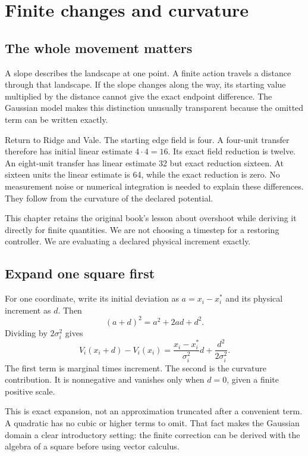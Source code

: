 \chapter{Finite changes and curvature}\label{ch:finite}

\section{The whole movement matters}
A slope describes the landscape at one point. A finite action travels a distance through that landscape. If the slope changes along the way, its starting value multiplied by the distance cannot give the exact endpoint difference. The Gaussian model makes this distinction unusually transparent because the omitted term can be written exactly.

Return to Ridge and Vale. The starting edge field is four. A four-unit transfer therefore has initial linear estimate \(4\cdot4=16\). Its exact field reduction is twelve. An eight-unit transfer has linear estimate 32 but exact reduction sixteen. At sixteen units the linear estimate is 64, while the exact reduction is zero. No measurement noise or numerical integration is needed to explain these differences. They follow from the curvature of the declared potential.

This chapter retains the original book's lesson about overshoot while deriving it directly for finite quantities. We are not choosing a timestep for a restoring controller. We are evaluating a declared physical increment exactly.

\section{Expand one square first}
For one coordinate, write its initial deviation as \(a=x_i-x_i^*\) and its physical increment as \(d\). Then
\begin{equation}
 (a+d)^2=a^2+2ad+d^2.
\end{equation}
Dividing by \(2\sigma_i^2\) gives
\begin{equation}
 V_i(x_i+d)-V_i(x_i)
 =\frac{x_i-x_i^*}{\sigma_i^2}d
  +\frac{d^2}{2\sigma_i^2}.
\end{equation}
The first term is marginal times increment. The second is the curvature contribution. It is nonnegative and vanishes only when \(d=0\), given a finite positive scale.

This is exact expansion, not an approximation truncated after a convenient term. A quadratic has no cubic or higher terms to omit. That fact makes the Gaussian domain a clear introductory setting: the finite correction can be derived with the algebra of a square before using vector calculus.

